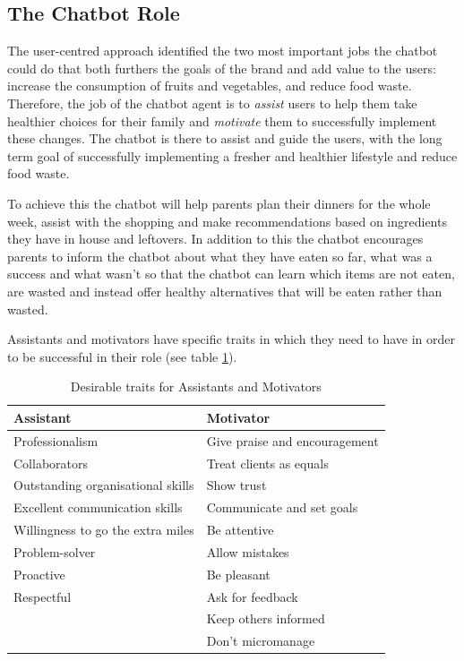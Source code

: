 \vspace{5mm}

    \subsection{The Chatbot Role}
    
    The user-centred approach identified the two most important jobs the chatbot could do that both furthers the goals of the brand and add value to the users: increase the consumption of fruits and vegetables, and reduce food waste. Therefore, the job of the chatbot agent is to \textit{assist} users to help them take healthier choices for their family and \textit{motivate} them to successfully implement these changes. The chatbot is there to assist and guide the users, with the long term goal of successfully implementing a fresher and healthier lifestyle and reduce food waste. 
    
    To achieve this the chatbot will help parents plan their dinners for the whole week, assist with the shopping and make recommendations based on ingredients they have in house and leftovers. In addition to this the chatbot encourages parents to inform the chatbot about what they have eaten so far, what was a success and what wasn’t so that the chatbot can learn which items are not eaten, are wasted and instead offer healthy alternatives that will be eaten rather than wasted. 
    
    Assistants and motivators have specific traits \citep{burge2016,lipcamon_2013} in which they need to have in order to be successful in their role (see table \ref{table:2}).
    
\vspace{2,5mm}

    \begin{table}[h]
    \begin{tabular}{ |p{}||p{}|  }
    \hline
    Assistant & Motivator \\
    \hline
        Professionalism & Give praise and encouragement \\
        Collaborators & Treat clients as equals \\
        Outstanding organisational skills & Show trust \\
        Excellent communication skills & Communicate and set goals \\
        Willingness to go the extra miles & Be attentive \\
        Problem-solver & Allow mistakes \\
        Proactive & Be pleasant \\
        Respectful & Ask for feedback \\
        & Keep others informed \\
        & Don’t micromanage \\
    \hline
    \end{tabular}
    \caption{Desirable traits for Assistants and Motivators}
    \label{table:2}
    \end{table}
 
